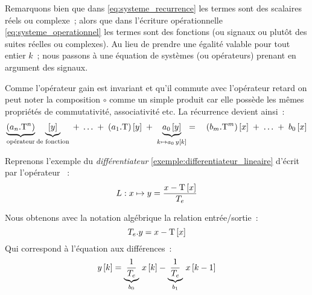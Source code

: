 \begin{remarque}
  Remarquons bien que dans \eqref{eq:systeme_recurrence} les termes
  sont des scalaires réels ou complexe~; alors que dans l'écriture
  opérationnelle \eqref{eq:systeme_operationnel} les termes sont des
  fonctions (ou signaux ou plutôt des suites réelles ou complexes). Au
  lieu de prendre une égalité valable pour tout entier $k$~; nous
  passons à une équation de systèmes (ou opérateurs) prenant en
  argument des signaux.
\end{remarque}


Comme l'opérateur gain est invariant et qu'il commute avec l'opérateur
retard on peut noter la composition $\circ$ comme un simple produit
car elle possède les mêmes propriétés de commutativité, associativité
etc. La récurrence devient ainsi~:
\begin{eqnarray}
 \underbrace{\left(a_n.\mathrm{T}^n\right)}_{\text{opérateur}}\underbrace{\left[y\right]}_{\text{de fonction}}\; +\; \ldots \;+\; \left(a_1.\mathrm{T}\right)\left[y\right] \;+\; \underbrace{a_0\left[y\right]}_{k\mapsto a_0\,y\left[k\right]}  = \quad \left(b_m.\mathrm{T}^m\right)\left[x\right] \;+\; \ldots \;+\; b_0\left[x\right]
\end{eqnarray}

\begin{exemple}
  Reprenons l'exemple du \emph{différentiateur} \ref{exemple:differentiateur_lineaire} d'écrit par l'opérateur ~: $$L : x \mapsto y=\frac{x-\mathrm{T}\left[x\right]}{T_e}$$
  
  Nous obtenons avec la notation algébrique la relation entrée/sortie~:
  $$
  T_e.y = x - \mathrm{T}\left[x\right]
  $$
  Qui correspond à l'équation aux différences~:
  $$
  y\left[k\right] = \underbrace{\frac{1}{T_e}}_{b_0}\,x\left[k\right]-\underbrace{\frac{1}{T_e}}_{b_1}\,x\left[k-1\right]
  $$
  
\end{exemple}

